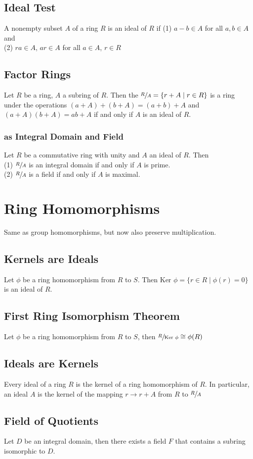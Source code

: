 \documentclass{article}
\begin{document}
\subsection{Ideal Test}
A nonempty subset $A$ of a ring $R$ is an ideal of $R$ if (1) $a-b \in A$ for all $a, b \in A$ and \\
(2) $ra \in A$, $ar \in A$ for all $a \in A$, $r \in R$ 
\subsection{Factor Rings}
Let $R$ be a ring, $A$ a subring of $R$. Then the $\sfrac{R}{A} = \{r + A \mid r \in R\}$ is a ring under the operations $(a+A) + (b+A) = (a+b) + A$ and $(a+A)(b+A) = ab + A$ if and only if $A$ is an ideal of $R$.
\subsubsection{ as Integral Domain and Field}
Let $R$ be a commutative ring with unity and $A$ an ideal of $R$. Then \\
(1) $\sfrac{R}{A}$ is an integral domain if and only if $A$ is prime. \\
(2) $\sfrac{R}{A}$ is a field if and only if $A$ is maximal.


\section{Ring Homomorphisms}
Same as group homomorphisms, but now also preserve multiplication. 
\subsection{Kernels are Ideals}
Let $\phi$ be a ring homomorphism from $R$ to $S$. Then $\text{Ker }\phi = \{r \in R \mid \phi(r) = 0\}$ is an ideal of $R$.
\subsection{First Ring Isomorphism Theorem}
Let $\phi$ be a ring homomorphism from $R$ to $S$, then $\sfrac{R}{\text{Ker }\phi} \cong \phi(R)$
\subsection{Ideals are Kernels}
Every ideal of a ring $R$ is the kernel of a ring homomorphism of $R$. In particular, an ideal $A$ is the kernel of the mapping $r \to r + A$ from $R$ to $\sfrac{R}{A}$
\subsection{Field of Quotients}
Let $D$ be an integral domain, then there exists a field $F$ that contains a subring isomorphic to $D$.
\end{document}

